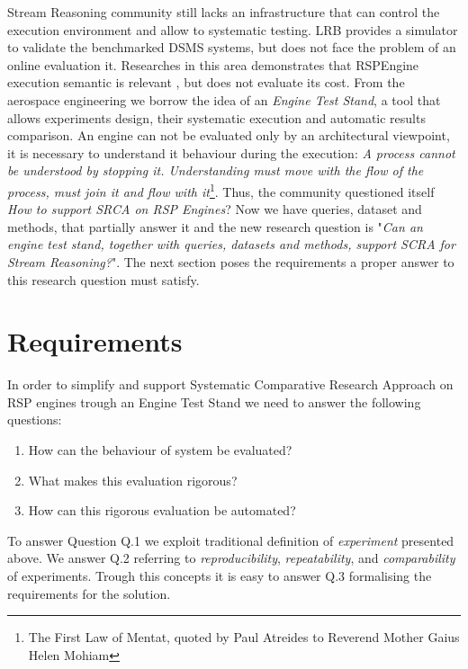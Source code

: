Stream Reasoning community still lacks an infrastructure that can control the execution environment and allow to systematic testing. LRB provides a simulator to validate the benchmarked DSMS systems, but does not face the problem of an online evaluation it. Researches in this area demonstrates that RSPEngine execution semantic is relevant \cite{Botan:2010:SMA:1920841.1920874}, but does not evaluate its cost. From the aerospace engineering we borrow the idea of an \textit{Engine Test Stand}, a tool that allows experiments design, their systematic execution and automatic results comparison. An engine can not be evaluated only by an architectural viewpoint, it is necessary to understand it behaviour during the execution: \textit{A process cannot be understood by stopping it. Understanding must move with the flow of the process, must join it and flow with it}\footnote{The First Law of Mentat, quoted by Paul Atreides to Reverend Mother Gaius Helen Mohiam}. Thus, the community questioned itself \textit{How to support SRCA on RSP Engines}? Now we have queries, dataset and methods, that partially answer it and the new research question is "\textit{Can an engine test stand, together with queries, datasets and methods, support SCRA for Stream Reasoning?}". The next section poses the requirements a proper answer to this research question must satisfy.

\section{Requirements} \label{sec:requirements}

In order to simplify and support Systematic Comparative Research Approach on RSP engines trough an Engine Test Stand we need to answer the following questions: 
\begin{enumerate}
\item[Q.1] How can the behaviour of system be evaluated? 
\item[Q.2] What makes this evaluation rigorous? 
\item[Q.3] How can this rigorous evaluation be automated?
\end{enumerate} To answer Question Q.1 we exploit traditional definition of \textit{experiment} presented above. We answer Q.2 referring to \textit{reproducibility}, \textit{repeatability}, and \textit{comparability} of experiments. Trough this concepts it is easy to answer Q.3 formalising the requirements for the solution.

